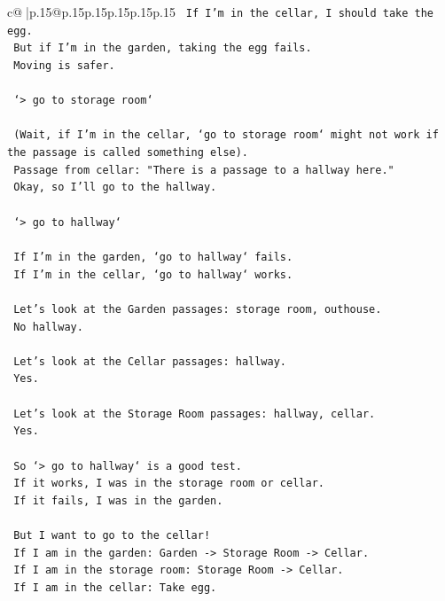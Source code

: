 \documentclass{article}
\begin{document}
{\begin{supertabular}{c@{$\;$}|p{.15\linewidth}@{}p{.15\linewidth}p{.15\linewidth}p{.15\linewidth}p{.15\linewidth}p{.15\linewidth}}
{{{\texttt{    If I'm in the cellar, I should take the egg.} \\
\texttt{    But if I'm in the garden, taking the egg fails.} \\
\texttt{    Moving is safer.} \\
\\ 
\texttt{    `> go to storage room`} \\
\\ 
\texttt{    (Wait, if I'm in the cellar, `go to storage room` might not work if the passage is called something else).} \\
\texttt{    Passage from cellar: "There is a passage to a hallway here."} \\
\texttt{    Okay, so I'll go to the hallway.} \\
\\ 
\texttt{    `> go to hallway`} \\
\\ 
\texttt{    If I'm in the garden, `go to hallway` fails.} \\
\texttt{    If I'm in the cellar, `go to hallway` works.} \\
\\ 
\texttt{    Let's look at the Garden passages: storage room, outhouse.} \\
\texttt{    No hallway.} \\
\\ 
\texttt{    Let's look at the Cellar passages: hallway.} \\
\texttt{    Yes.} \\
\\ 
\texttt{    Let's look at the Storage Room passages: hallway, cellar.} \\
\texttt{    Yes.} \\
\\ 
\texttt{    So `> go to hallway` is a good test.} \\
\texttt{    If it works, I was in the storage room or cellar.} \\
\texttt{    If it fails, I was in the garden.} \\
\\ 
\texttt{    But I want to go to the cellar!} \\
\texttt{    If I am in the garden: Garden {-}> Storage Room {-}> Cellar.} \\
\texttt{    If I am in the storage room: Storage Room {-}> Cellar.} \\
\texttt{    If I am in the cellar: Take egg.} \\
}}}
\end{supertabular}}
\end{document}
